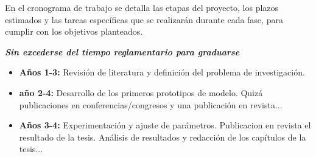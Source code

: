 En el cronograma de trabajo se detalla las etapas del proyecto, los plazos estimados y las tareas específicas que se realizarán durante cada fase, para cumplir con los objetivos planteados.

\textbf{\emph{Sin excederse del tiempo reglamentario para graduarse}}


\begin{itemize}
	\item \textbf{Años 1-3:} Revisión de literatura y definición del problema de investigación.
	\item \textbf{año 2-4:} Desarrollo de los primeros prototipos de modelo. Quizá publicaciones en conferencias/congresos y una publicación en revista...
	\item \textbf{Años 3-4:} Experimentación y ajuste de parámetros. Publicacion en revista el resultado de la tesis.
	      Análisis de resultados y redacción de los capítulos de la tesis...
\end{itemize}
